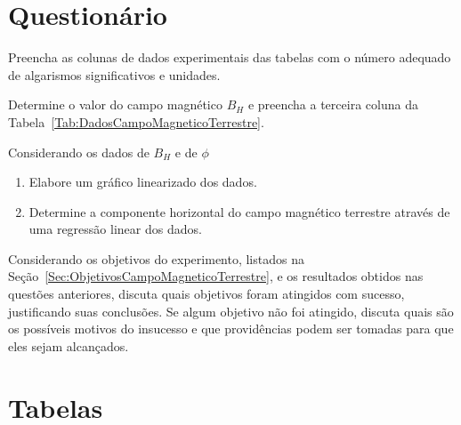 \vspace{5mm}

\section{Questionário}

\begin{question}[type={exam}]{2}
Preencha as colunas de dados experimentais das tabelas com o número adequado de algarismos significativos e unidades.
\end{question}

\begin{question}[type={exam}]{2}
Determine o valor do campo magnético $B_H$ e preencha a terceira coluna da Tabela~\ref{Tab:DadosCampoMagneticoTerrestre}.
\end{question}

\begin{question}[type={exam}]{4}
Considerando os dados de $B_H$ e de $\phi$
\begin{enumerate}[label=\roman*.]
    \item Elabore um gráfico linearizado dos dados.
    \item Determine a componente horizontal do campo magnético terrestre através de uma regressão linear dos dados. 
\end{enumerate}
\end{question}

\begin{question}[type={exam}]{2}
Considerando os objetivos do experimento, listados na Seção~\ref{Sec:ObjetivosCampoMagneticoTerrestre}, e os resultados obtidos nas questões anteriores, discuta quais objetivos foram atingidos com sucesso, justificando suas conclusões. Se algum objetivo não foi atingido, discuta quais são os possíveis motivos do insucesso e que providências podem ser tomadas para que eles sejam alcançados.
\end{question}

\vfill
\pagebreak
\section{Tabelas}

